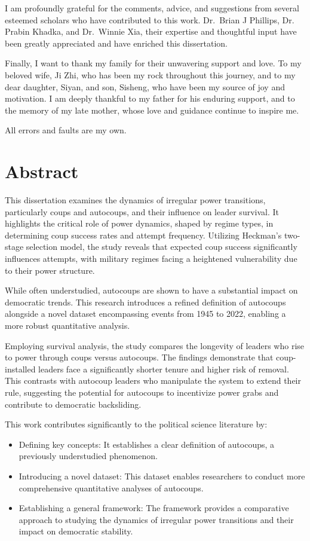 \documentclass[
  12pt,
]{report}
\begin{document}
I am profoundly grateful for the comments, advice, and suggestions from
several esteemed scholars who have contributed to this work. Dr.~Brian J
Phillips, Dr. Prabin Khadka, and Dr.~Winnie Xia, their expertise and
thoughtful input have been greatly appreciated and have enriched this
dissertation.

Finally, I want to thank my family for their unwavering support and
love. To my beloved wife, Ji Zhi, who has been my rock throughout this
journey, and to my dear daughter, Siyan, and son, Sisheng, who have been
my source of joy and motivation. I am deeply thankful to my father for
his enduring support, and to the memory of my late mother, whose love
and guidance continue to inspire me.

All errors and faults are my own.

\chapter*{Abstract}\label{abstract}

This dissertation examines the dynamics of irregular power transitions,
particularly coups and autocoups, and their influence on leader
survival. It highlights the critical role of power dynamics, shaped by
regime types, in determining coup success rates and attempt frequency.
Utilizing Heckman's two-stage selection model, the study reveals that
expected coup success significantly influences attempts, with military
regimes facing a heightened vulnerability due to their power structure.

While often understudied, autocoups are shown to have a substantial
impact on democratic trends. This research introduces a refined
definition of autocoups alongside a novel dataset encompassing events
from 1945 to 2022, enabling a more robust quantitative analysis.

Employing survival analysis, the study compares the longevity of leaders
who rise to power through coups versus autocoups. The findings
demonstrate that coup-installed leaders face a significantly shorter
tenure and higher risk of removal. This contrasts with autocoup leaders
who manipulate the system to extend their rule, suggesting the potential
for autocoups to incentivize power grabs and contribute to democratic
backsliding.

This work contributes significantly to the political science literature
by:

\begin{itemize}
\item
  Defining key concepts: It establishes a clear definition of autocoups,
  a previously understudied phenomenon.
\item
  Introducing a novel dataset: This dataset enables researchers to
  conduct more comprehensive quantitative analyses of autocoups.
\item
  Establishing a general framework: The framework provides a comparative
  approach to studying the dynamics of irregular power transitions and
  their impact on democratic stability.
\end{itemize}
\end{document}
